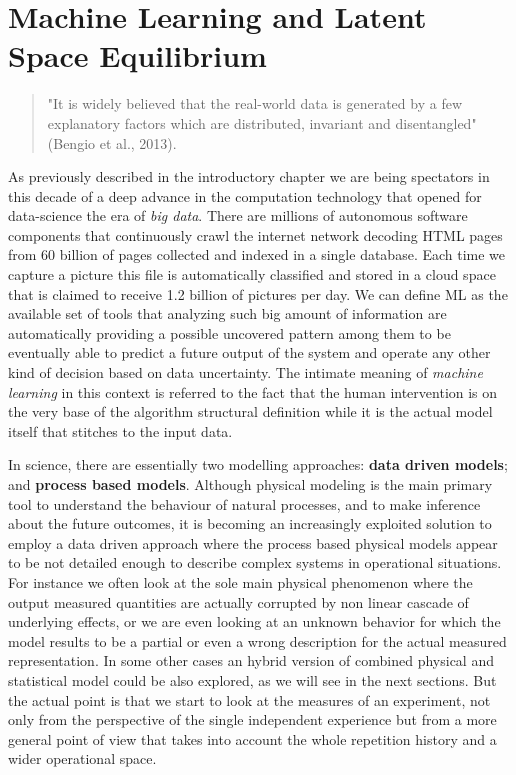 \chapter{Machine Learning and Latent Space Equilibrium}
%
\begin{quote}
"It is widely believed that the real-world data is generated by a few explanatory factors which are distributed, invariant and disentangled" (Bengio et al., 2013).
\end{quote}
%
As previously described in the introductory chapter we are being spectators in this decade of a deep advance in the computation technology that opened for data-science the era of \textit{big data}. There are millions of autonomous software components that continuously crawl the internet network decoding HTML pages from 60 billion of pages collected and indexed in a single database. Each time we capture a picture this file is automatically classified and stored in a cloud space that is claimed to receive 1.2 billion of pictures per day. 
%
We can define ML as the available set of tools that analyzing such big amount of information are automatically providing a possible uncovered pattern among them to be eventually able to predict a future output of the system and operate any other kind of decision based on data uncertainty. The intimate meaning of \textit{machine learning} in this context is referred to the fact that the human intervention is on the very base of the algorithm structural definition while it is the actual model itself that stitches to the input data.  

In science, there are essentially two modelling approaches: \textbf{data driven models}; and \textbf{process based models}.
Although physical modeling is the main primary tool to understand the behaviour of natural processes, and to make inference about the future outcomes, it is becoming an increasingly exploited solution to employ a data driven approach where the process based physical models appear to be not detailed enough to describe complex systems in operational situations. For instance we often look at the sole main physical phenomenon where the output measured quantities are actually corrupted by non linear cascade of underlying effects, or we are even looking at an unknown behavior for which the model results to be a partial or even a wrong description for the actual measured representation. 
In some other cases an hybrid version of combined physical and statistical model could be also explored, as we will see in the next sections. But the actual point is that we start to look at the measures of an experiment, not only from the perspective of the single independent experience but from a more general point of view that takes into account the whole repetition history and a wider operational space.  


